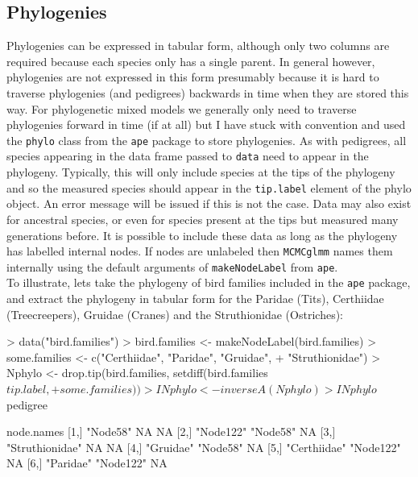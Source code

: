 \documentclass{article}
\begin{document}
\subsection{Phylogenies}

Phylogenies can be expressed in tabular form, although only two columns are required because each species only has a single parent. In general however,  phylogenies are not expressed in this form presumably because it is hard to traverse phylogenies (and pedigrees) backwards in time when they are stored this way. For phylogenetic mixed models we generally only need to traverse phylogenies forward in time (if at all) but I have stuck with convention and used the \texttt{phylo} class from the \texttt{ape} package to store phylogenies.  As with pedigrees, all species appearing in the data frame passed to \texttt{data} need to appear in the phylogeny. Typically, this will only include species at the tips of the phylogeny and so the measured species should appear in the \texttt{tip.label} element of the phylo object. An error message will be issued if this is not the case. Data may also exist for ancestral species, or even for species present at the tips but measured many generations before. It is possible to include these data as long as the phylogeny has labelled internal nodes. If nodes are unlabeled then  \texttt{MCMCglmm}  names them internally using the default arguments of   \texttt{makeNodeLabel} from \texttt{ape}.\\ 

To illustrate, lets take the phylogeny of bird families included in the \texttt{ape} package, and extract the phylogeny in tabular form for the Paridae (Tits), Certhiidae (Treecreepers), Gruidae (Cranes) and the Struthionidae (Ostriches):

\begin{Schunk}
\begin{Sinput}
> data("bird.families")
> bird.families <- makeNodeLabel(bird.families)
> some.families <- c("Certhiidae", "Paridae", "Gruidae", 
+     "Struthionidae")
> Nphylo <- drop.tip(bird.families, setdiff(bird.families$tip.label, 
+     some.families))
> INphylo <- inverseA(Nphylo)
> INphylo$pedigree
\end{Sinput}
\begin{Soutput}
     node.names                  
[1,] "Node58"        NA        NA
[2,] "Node122"       "Node58"  NA
[3,] "Struthionidae" NA        NA
[4,] "Gruidae"       "Node58"  NA
[5,] "Certhiidae"    "Node122" NA
[6,] "Paridae"       "Node122" NA
\end{Soutput}
\end{Schunk}
\end{document}
